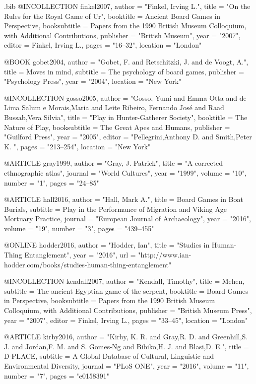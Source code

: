\begin{filecontents}{\IJSRAidentifier.bib}
@INCOLLECTION {finkel2007,
	author    = "Finkel, Irving L.",
	title     = "On the Rules for the Royal Game of Ur",
	booktitle = {Ancient Board Games in Perspective},
	booksubtitle = {Papers from the 1990 British Museum Colloquium, with Additional Contributions},
	publisher = "British Museum",
	year      = "2007",
	editor    = {Finkel, Irving L.},
	pages     = "16--32",
	location   = "London"
}

@BOOK {gobet2004,
	author    = "Gobet, F. and Retschitzki, J. and  de Voogt, A.",
	title     = {Moves in mind},
	subtitle = {The psychology of board games},
	publisher = "Psychology Press",
	year      = "2004",
	location   = "New York"
}

@INCOLLECTION {gosso2005,
	author    = "Gosso, Yumi and  Emma Otta and  de Lima Salum e Morais,Maria and Leite Ribeiro, Fernando José  and Raad Bussab,Vera Silvia",
	title     = "Play in Hunter-Gatherer Society",
	booktitle = {The Nature of Play},
	booksubtitle = {The Great Apes and Humans},
	publisher = "Guilford Press",
	year      = "2005",
	editor    = "Pellegrini,Anthony D.  and Smith,Peter K. ",
	pages     = "213--254",
	location   = "New York"
}

@ARTICLE {gray1999,
	author  = "Gray, J. Patrick",
	title   = "A corrected ethnographic atlas",
	journal = "World Cultures",
	year    = "1999",
	volume  = "10",
	number  = "1",
	pages   = "24--85"
}

@ARTICLE {hall2016,
	author  = "Hall, Mark A.",
	title   = {Board Games in Boat Burials},
	subtitle = {Play in the Performance of Migration and Viking Age Mortuary Practice},
	journal = "European Journal of Archaeology",
	year    = "2016",
	volume  = "19",
	number  = "3",
	pages   = "439--455"
}

@ONLINE {hodder2016,
	author = "Hodder, Ian",
	title  = "Studies in Human-Thing Entanglement",
	year   = "2016",
	url    = "http://www.ian-hodder.com/books/studies-human-thing-entanglement"
}

@INCOLLECTION {kendall2007,
	author    = "Kendall, Timothy",
	title     = {Mehen},
	subtitle = {The ancient Egyptian game of the serpent},
	booktitle = {Board Games in Perspective},
	booksubtitle = {Papers from the 1990 British Museum Colloquium, with Additional Contributions},
	publisher = "British Museum Press",
	year      = "2007",
	editor    = {Finkel, Irving L.},
	pages     = "33--45",
	location   = "London"
}

@ARTICLE {kirby2016,
	author  = "Kirby, K. R. and Gray,R. D.  and  Greenhill,S. J.  and  Jordan,F. M.  and  S. Gomes-Ng and   Bibiko,H. J. and  Blasi,D. E.",
	title   = {D-PLACE},
	subtitle = {A Global Database of Cultural, Linguistic and Environmental Diversity},
	journal = "PLoS ONE",
	year    = "2016",
	volume  = "11",
	number  = "7",
	pages   = "e0158391"
}


\end{filecontents}
